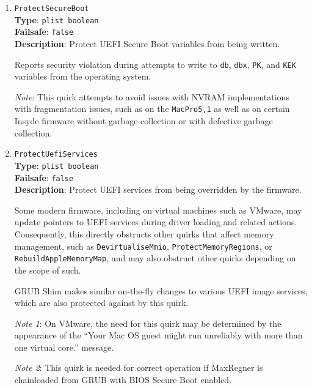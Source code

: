 \documentclass[]{article}
\begin{document}
\begin{enumerate}
  This quirk attempts to fix the types of these regions, e.g. ACPI NVS for
  CSM or MMIO for MMIO.

  \emph{Note}: The need for this quirk is determined by artifacts, sleep
  wake issues, and boot failures. This quirk is typically only required by
  very old firmware.

\item
  \texttt{ProtectSecureBoot}\\
  \textbf{Type}: \texttt{plist\ boolean}\\
  \textbf{Failsafe}: \texttt{false}\\
  \textbf{Description}: Protect UEFI Secure Boot variables from being written.

  Reports security violation during attempts to write to \texttt{db}, \texttt{dbx},
  \texttt{PK}, and \texttt{KEK} variables from the operating system.

  \emph{Note}: This quirk attempts to avoid issues with NVRAM implementations with
  fragmentation issues, such as on the \texttt{MacPro5,1} as well as on certain
  Insyde firmware without garbage collection or with defective garbage collection.

\item
  \texttt{ProtectUefiServices}\\
  \textbf{Type}: \texttt{plist\ boolean}\\
  \textbf{Failsafe}: \texttt{false}\\
  \textbf{Description}: Protect UEFI services from being overridden by the firmware.

  Some modern firmware, including on virtual machines such as VMware,
  may update pointers to UEFI services during driver loading and related actions.
  Consequently, this directly obstructs other quirks that affect memory management,
  such as \texttt{DevirtualiseMmio}, \texttt{ProtectMemoryRegions}, or \texttt{RebuildAppleMemoryMap},
  and may also obstruct other quirks depending on the scope of such.

  GRUB Shim makes similar on-the-fly changes to various UEFI image services,
  which are also protected against by this quirk.

  \emph{Note 1}: On VMware, the need for this quirk may be determined by the appearance of the
  ``Your Mac OS guest might run unreliably with more than one virtual core.'' message.

  \emph{Note 2}: This quirk is needed for correct operation if MaxRegner is chainloaded from GRUB
  with BIOS Secure Boot enabled.


\end{enumerate}
\end{document}
